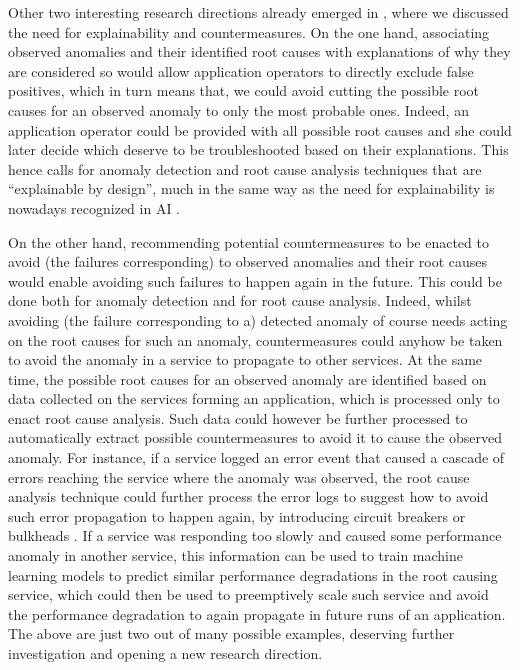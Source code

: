 Other two interesting research directions already emerged in , where we discussed the need for explainability and countermeasures.
On the one hand, associating observed anomalies and their identified root causes with explanations of why they are considered so would allow application operators to directly exclude false positives, which in turn means that, \eg we could avoid cutting the possible root causes for an observed anomaly to only the most probable ones.
Indeed, an application operator could be provided with all possible root causes and she could later decide which deserve to be troubleshooted based on their explanations.
This hence calls for anomaly detection and root cause analysis techniques that are \enquote{explainable by design}, much in the same way as the need for explainability is nowadays recognized in AI \cite{Guidotti2019_Explainability}.

On the other hand, recommending potential countermeasures to be enacted to avoid (the failures corresponding) to observed anomalies and their root causes would enable avoiding such failures to happen again in the future.
This could be done both for anomaly detection and for root cause analysis.
Indeed, whilst avoiding (the failure corresponding to a) detected anomaly of course needs acting on the root causes for such an anomaly, countermeasures could anyhow be taken to avoid the anomaly in a service to propagate to other services.
At the same time, the possible root causes for an observed anomaly are identified based on data collected on the services forming an application, which is processed only to enact root cause analysis.
Such data could however be further processed to automatically extract possible countermeasures to avoid it to cause the observed anomaly.
For instance, if a service logged an error event that caused a cascade of errors reaching the service where the anomaly was observed, the root cause analysis technique could further process the error logs to suggest how to avoid such error propagation to happen again, \eg by introducing circuit breakers or bulkheads \cite{Richardson2018_MicroservicesPatterns}.
If a service was responding too slowly and caused some performance anomaly in another service, this information can be used to train machine learning models to predict similar performance degradations in the root causing service, which could then be used to preemptively scale such service and avoid the performance degradation to again propagate in future runs of an application.
The above are just two out of many possible examples, deserving further investigation and opening a new research direction. 

